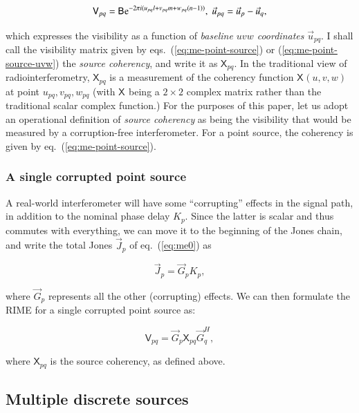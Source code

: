 \documentclass[]{aa}
\newcommand{\herm}{H}
\newcommand{\jones}[2]{\vec {#1}_{#2}}
\newcommand{\jonesT}[2]{\vec {#1}^{\herm}_{#2}}
\newcommand{\coh}[2]{\mathsf{{#1}}_{{#2}}}
\begin{document}
  \begin{equation}\label{eq:me-point-source-uvw}
  \coh{V}{pq} = \coh{B}{}  {\rm e}^{-2\pi i(u_{pq} l+v_{pq} m+w_{pq} (n-1))},\;\vec u_{pq} = \vec u_p - \vec u_q,
  \end{equation}
 
which expresses the visibility as a function of {\em baseline $uvw$ coordinates} $\vec u_{pq}$. I shall call the visibility matrix given by eqs.~(\ref{eq:me-point-source}) or (\ref{eq:me-point-source-uvw}) the {\em source coherency}, and write it as $\coh{X}{pq}$. In the traditional view of radiointerferometry, $\coh{X}{pq}$ is a measurement of the coherency function $\coh{X}{}(u,v,w)$ at point $u_{pq},v_{pq},w_{pq}$ (with $\coh{X}{}$ being a $2\times2$ complex matrix rather than the traditional scalar complex function.) For the purposes of this paper, let us adopt an operational definition of {\em source coherency} as being the visibility that would be measured by a corruption-free interferometer. For a point source, the coherency is given by eq.~(\ref{eq:me-point-source}).

\subsubsection{A single corrupted point source}

A real-world interferometer will have some ``corrupting'' effects in the signal path, in addition to the nominal phase delay $K_p$. Since the latter is scalar and thus commutes with everything, we can move it to the beginning of the Jones chain, and write the total Jones $\jones{J}{p}$ of eq.~(\ref{eq:me0}) as

\[
\jones{J}{p} = \jones{G}{p} K_p,
\]

where $\jones{G}{p}$ represents all the other (corrupting) effects. We can then formulate the RIME for a single corrupted point source as:

  \begin{equation}\label{eq:me-point-source-corrupted}
  \coh{V}{pq} = \jones{G}{p} \coh{X}{pq} \jonesT{G}{q},
  \end{equation}

where $\coh{X}{pq}$ is the source coherency, as defined above.
 

\subsection{Multiple discrete sources\label{sec:me-multiple-sources}}
\end{document}
